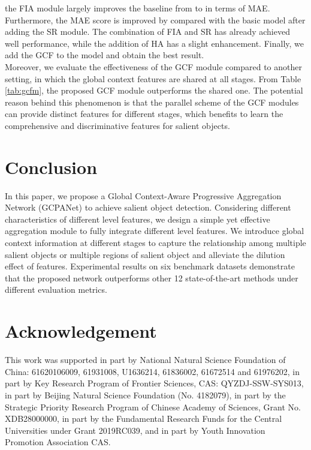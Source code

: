 \documentclass[letterpaper]{article} \usepackage{aaai20}  \usepackage{times}  \usepackage{helvet} \usepackage{courier}  \usepackage[hyphens]{url}  \usepackage{graphicx} \urlstyle{rm} \def\UrlFont{\rm}  \usepackage{graphicx}  \frenchspacing  \setlength{\pdfpagewidth}{8.5in}  \setlength{\pdfpageheight}{11in}
\begin{document}
the FIA module largely improves the baseline from  to  in terms of MAE.
Furthermore, the MAE score is improved by  compared with the basic model after adding the SR module.
The combination of FIA and SR has already achieved well performance, while the addition of HA has a slight enhancement. 
Finally, we add the GCF to the model and obtain the best result. \\
\indent Moreover, we evaluate the effectiveness of the GCF module compared to another setting, 
in which the global context features are shared at all stages.
From Table \ref{tab:gcfm}, the proposed GCF module outperforms the shared one.
The potential reason behind this phenomenon is that the parallel scheme of the GCF modules can provide distinct features for different stages,
which benefits to learn the comprehensive and discriminative features for salient objects. 
\section{Conclusion}
In this paper, we propose a Global Context-Aware Progressive Aggregation Network (GCPANet) to achieve salient object detection.
Considering different characteristics of different level features,  we design a simple yet effective aggregation module to fully integrate different level features. We introduce global context information at different stages to capture the relationship among multiple salient objects or multiple regions of salient object and alleviate the dilution effect of features.
Experimental results on six benchmark datasets demonstrate that the proposed network outperforms other 12 state-of-the-art methods
under different evaluation metrics.
\section{Acknowledgement}
This work was supported in part by National Natural Science Foundation of China: 61620106009, 61931008, U1636214, 61836002, 61672514 and 61976202, in part by Key Research Program of Frontier Sciences, CAS: QYZDJ-SSW-SYS013, in part by Beijing Natural Science Foundation (No. 4182079), in part by the Strategic Priority Research Program of Chinese Academy of Sciences, Grant No. XDB28000000, in part by the Fundamental Research Funds for the Central Universities under Grant 2019RC039, and in part by Youth Innovation Promotion Association CAS.



\end{document}
